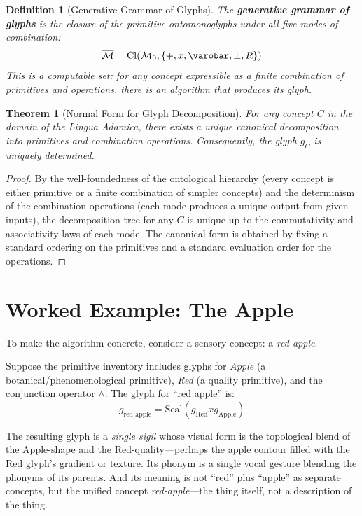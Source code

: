 \documentclass[12pt, letterpaper]{book}
\def\otimes{x}%
\def\oplus{+}%
\def\circlearrowleft{R}%
\def\mathfrak#1{#1}%
\newtheorem{theorem}{Theorem}[chapter]
\newtheorem{definition}{Definition}[chapter]
\begin{document}
\begin{definition}[Generative Grammar of Glyphs]\label{def:gen-grammar}
The \textbf{generative grammar of glyphs} is the closure of the primitive ontomonoglyphs under all five modes of combination:
\[
\overline{\mathcal{M}} = \mathrm{Cl}(\mathcal{M}_0, \{\oplus, \otimes, \varobar, \perp, \circlearrowleft\})
\]
This is a computable set: for any concept expressible as a finite combination of primitives and operations, there is an algorithm that produces its glyph.
\end{definition}

\begin{theorem}[Normal Form for Glyph Decomposition]\label{thm:normal-form}
For any concept $C$ in the domain of the Lingua Adamica, there exists a unique canonical decomposition into primitives and combination operations. Consequently, the glyph $\mathfrak{g}_C$ is uniquely determined.
\end{theorem}

\begin{proof}
By the well-foundedness of the ontological hierarchy (every concept is either primitive or a finite combination of simpler concepts) and the determinism of the combination operations (each mode produces a unique output from given inputs), the decomposition tree for any $C$ is unique up to the commutativity and associativity laws of each mode. The canonical form is obtained by fixing a standard ordering on the primitives and a standard evaluation order for the operations.
\end{proof}

\section{Worked Example: The Apple}

To make the algorithm concrete, consider a sensory concept: a \textit{red apple}.

Suppose the primitive inventory includes glyphs for \textit{Apple} (a botanical/phenomenological primitive), \textit{Red} (a quality primitive), and the conjunction operator $\land$. The glyph for ``red apple'' is:
\[
\mathfrak{g}_{\text{red apple}} = \mathrm{Seal}(\mathfrak{g}_\text{Red} \otimes \mathfrak{g}_\text{Apple})
\]

The resulting glyph is a \textit{single sigil} whose visual form is the topological blend of the Apple-shape and the Red-quality---perhaps the apple contour filled with the Red glyph's gradient or texture. Its phonym is a single vocal gesture blending the phonyms of its parents. And its meaning is not ``red'' plus ``apple'' as separate concepts, but the unified concept \textit{red-apple}---the thing itself, not a description of the thing.
\end{document}
